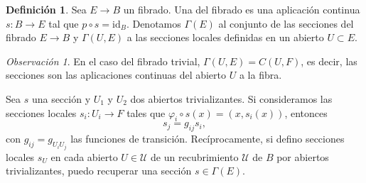 \documentclass[12pt,a4paper]{article}
\theoremstyle{definition} \newtheorem{defn}[thm]{Definición}
\theoremstyle{definition} \newtheorem{ejemplo}[thm]{Ejemplo}
\theoremstyle{definition} \newtheorem{ejercicio}[thm]{Ejercicio}
\theoremstyle{remark} \newtheorem*{obs}{Observación}
\def\id{\mathrm{id}}
\let\emph\relax
\begin{document}
	    \begin{defn}
	      Sea $E\rightarrow B$ un fibrado. Una \emph{sección} del fibrado es una aplicación continua $s:B\rightarrow E$ tal que $p\circ s = \id_B$. Denotamos $\Gamma(E)$ al conjunto de las secciones del fibrado $E\rightarrow B$ y $\Gamma(U,E)$ a las secciones locales definidas en un abierto $U\subset E$.
	    \end{defn}
	    \begin{obs}
	      En el caso del fibrado trivial, $\Gamma(U,E)=C(U,F)$, es decir, las secciones son las aplicaciones continuas del abierto $U$ a la fibra.
	    \end{obs}

	    Sea $s$ una sección y $U_1$ y $U_2$ dos abiertos trivializantes. Si consideramos las secciones locales $s_{i}:U_i \rightarrow F$ tales que $\varphi_i \circ s(x)=(x,s_i(x))$, entonces 
	    \begin{equation*}
	      s_j = g_{ij} s_i,
	    \end{equation*}
	    con $g_{ij}=g_{U_iU_j}$ las funciones de transición. Recíprocamente, si defino secciones locales $s_U$ en cada abierto $U\in \mathcal{U}$ de un recubrimiento $\mathcal{U}$ de $B$ por abiertos trivializantes, puedo recuperar una sección $s\in \Gamma(E)$.
	      
\end{document}
